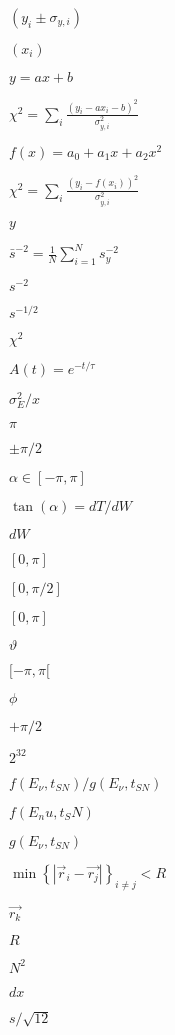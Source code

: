 \documentclass{article}
\begin{document}
$ ( y_{i} \pm \sigma_{y,i} ) $
\pagebreak

$ ( x_{i} ) $
\pagebreak

$ y = a x + b $
\pagebreak

$ \chi^{2} = \sum_{i} \frac{ \left(y_{i} - a x_{i} - b \right)^{2} }{ \sigma^{2}_{y,i} }$
\pagebreak

$ f(x) = a_{0} + a_{1} x + a_{2} x^{2} $
\pagebreak

$ \chi^{2} = \sum_{i} \frac{ \left(y_{i} - f(x_{i}) \right)^{2} }{ \sigma^{2}_{y,i} }$
\pagebreak

$ y $
\pagebreak

$ \bar{s}^{-2} = \frac{1}{N} \sum_{i=1}^{N} s_{y}^{-2} $
\pagebreak

$ s^{-2} $
\pagebreak

$ s^{-1/2} $
\pagebreak

$ \chi^{2} $
\pagebreak

$ A(t) = e^{-t/\tau} $
\pagebreak

$ \sigma_{E}^2 / x $
\pagebreak

$ \pi $
\pagebreak

$ \pm\pi/2 $
\pagebreak

$ \alpha \in [ -\pi, \pi ]$
\pagebreak

$ \tan(\alpha) = dT/dW $
\pagebreak

$ dW $
\pagebreak

$[ 0, \pi ]$
\pagebreak

$ [ 0, \pi/2 ] $
\pagebreak

$ [0,\pi] $
\pagebreak

$ \vartheta $
\pagebreak

$ [-\pi,\pi[ $
\pagebreak

$ \phi $
\pagebreak

$ +\pi/2 $
\pagebreak

$ 2^{32} $
\pagebreak

$f(E_{\nu}, t_{SN}) / g(E_{\nu}, t_{SN})$
\pagebreak

$ f(E_nu, t_SN) $
\pagebreak

$ g(E_{\nu}, t_{SN})$
\pagebreak

$ \min \left\{ \left| \vec{r}_{i} - \vec{r_{j}} \right| \right\}_{i \neq j} < R $
\pagebreak

$ \vec{r_{k}} $
\pagebreak

$ R $
\pagebreak

$ N^{2} $
\pagebreak

$ dx $
\pagebreak

$ s/\sqrt{12} $
\pagebreak
\end{document}
